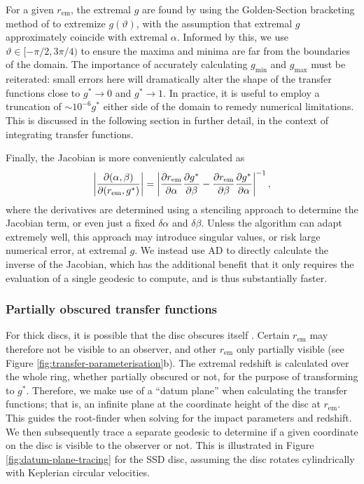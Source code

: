 For a given $r_\text{em}$, the extremal $g$ are found by using the Golden-Section bracketing method of \cite{optimize.jl} to extremize $g(\vartheta)$, with the assumption that extremal $g$ approximately coincide with extremal $\alpha$. Informed by this, we use $\vartheta \in [ -\pi/2, 3\pi/4 )$ to ensure the maxima and minima are far from the boundaries of the domain. The importance of accurately calculating $g_\text{min}$ and $g_\text{max}$ must be reiterated: small errors here will dramatically alter the shape of the transfer functions close to $g^\ast \rightarrow 0$ and $g^\ast \rightarrow 1$. In practice, it is useful to employ a truncation of $\sim 10^{-6}g^\ast$ either side of the 
domain to remedy numerical limitations. This is discussed in the following section in further detail, in the context of integrating transfer functions.

Finally, the Jacobian is more conveniently calculated as
\begin{equation}
    \left\lvert 
    \frac{\partial (\alpha, \beta)}{\partial (r_\text{em}, g^\ast)} 
    \right\rvert
    =
    \left\lvert
    \frac{\partial r_\text{em}}{\partial \alpha}\frac{\partial g^\ast}{\partial \beta}
    -
    \frac{\partial r_\text{em}}{\partial \beta}\frac{\partial g^\ast}{\partial \alpha}
    \right\rvert^{-1},
\end{equation}
where the derivatives are determined using a stenciling approach to determine the Jacobian term, or even just a fixed $\delta \alpha$ and $\delta \beta$. Unless the algorithm can adapt extremely well, this approach may introduce singular values, or risk large numerical error, at extremal $g$. We instead use AD to directly calculate the inverse of the Jacobian, which has the additional benefit that it only requires the evaluation of a single geodesic to compute, and is thus substantially faster. 

\subsubsection{Partially obscured transfer functions}

For thick discs, it is possible that the disc obscures itself \citep{taylor_x-ray_2018} . Certain $r_\text{em}$ may therefore not be visible to an observer, and other $r_\text{em}$ only partially visible (see Figure \ref{fig:transfer-parameterisation}b). The extremal redshift is calculated over the whole ring, whether partially obscured or not, for the purpose of transforming to $g^\ast$. Therefore, we make use of a ``datum plane'' when calculating the transfer functions; that is, an infinite plane at the coordinate height of the disc at $r_\text{em}$. This guides the root-finder when solving for the impact parameters and redshift. We then subsequently trace a separate geodesic to determine if a given coordinate on the disc is visible to the observer or not. This is illustrated in Figure \ref{fig:datum-plane-tracing} for the SSD disc, assuming the disc rotates cylindrically with Keplerian circular velocities.

